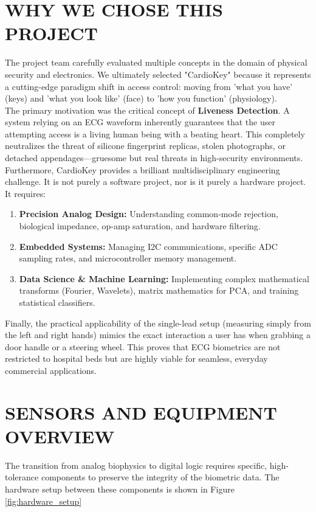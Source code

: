 \documentclass[12pt,a4paper]{report}
\begin{document}
\chapter{WHY WE CHOSE THIS PROJECT}
The project team carefully evaluated multiple concepts in the domain of physical security and electronics. We ultimately selected "CardioKey" because it represents a cutting-edge paradigm shift in access control: moving from 'what you have' (keys) and 'what you look like' (face) to 'how you function' (physiology).\\

The primary motivation was the critical concept of \textbf{Liveness Detection}. A system relying on an ECG waveform inherently guarantees that the user attempting access is a living human being with a beating heart. This completely neutralizes the threat of silicone fingerprint replicas, stolen photographs, or detached appendages—gruesome but real threats in high-security environments.\\

Furthermore, CardioKey provides a brilliant multidisciplinary engineering challenge. It is not purely a software project, nor is it purely a hardware project. It requires:
\begin{enumerate}
\item \textbf{Precision Analog Design:} Understanding common-mode rejection, biological impedance, op-amp saturation, and hardware filtering.
\item \textbf{Embedded Systems:} Managing I2C communications, specific ADC sampling rates, and microcontroller memory management.
\item \textbf{Data Science \& Machine Learning:} Implementing complex mathematical transforms (Fourier, Wavelets), matrix mathematics for PCA, and training statistical classifiers. \\
\end{enumerate}

Finally, the practical applicability of the single-lead setup (measuring simply from the left and right hands) mimics the exact interaction a user has when grabbing a door handle or a steering wheel. This proves that ECG biometrics are not restricted to hospital beds but are highly viable for seamless, everyday commercial applications.

\chapter{SENSORS AND EQUIPMENT OVERVIEW}
The transition from analog biophysics to digital logic requires specific, high-tolerance components to preserve the integrity of the biometric data. The hardware setup between these components is shown in Figure \ref{fig:hardware_setup}
\end{document}
